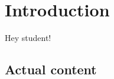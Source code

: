 \documentclass[a4paper,12pt]{article}
\begin{document}
\section{Introduction}
 Hey student!

\myothercommand{} \subsection{Actual content}

\end{document}
